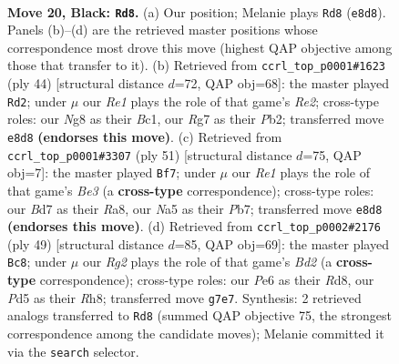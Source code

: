 \documentclass[11pt]{article}
\begin{document}
\clearpage

\begin{figure}[p]\centering
\begin{subfigure}{0.46\textwidth}\centering
\resizebox{\linewidth}{!}{%
\newchessgame
\chessboard[
  setfen={2k1rbn1/pp1b2r1/4p1p1/nP1pP1Pp/P2P1P1N/4K3/8/RNB2B1R b - - 0 20},
  showmover=false,
  pgfstyle=straightmove, color=movearrow, markmove={e8-d8}
]}
\caption{}
\end{subfigure}\hfill
\begin{subfigure}{0.46\textwidth}\centering
\resizebox{\linewidth}{!}{%
\newchessgame
\chessboard[
  setfen={1k5r/1p1r1pb1/4p1p1/p3P2p/Pn1p1P1P/5BP1/1PP1R1K1/R1B5 w - - 1 23},
  showmover=false,
  pgfstyle=straightmove, color=movearrow, markmove={e2-d2}
]}
\caption{}
\end{subfigure}
\\[4pt]
\begin{subfigure}{0.46\textwidth}\centering
\resizebox{\linewidth}{!}{%
\newchessgame
\chessboard[
  setfen={r5k1/1p2r1p1/2p1b2p/3n1p2/p1BPp3/P3P2P/1PRN1PPK/6R1 b - - 7 26},
  showmover=false,
  pgfstyle=straightmove, color=movearrow, markmove={e6-f7}
]}
\caption{}
\end{subfigure}\hfill
\begin{subfigure}{0.46\textwidth}\centering
\resizebox{\linewidth}{!}{%
\newchessgame
\chessboard[
  setfen={1k1r3r/pp1bbpp1/2p1p2p/N2nP3/1P1P4/P5P1/3NBP1P/R1R3K1 b - - 0 25},
  showmover=false,
  pgfstyle=straightmove, color=movearrow, markmove={d7-c8}
]}
\caption{}
\end{subfigure}
\caption{\textbf{Move 20, Black: \texttt{Rd8}.} (a) Our position; Melanie plays \texttt{Rd8} (\texttt{e8d8}). Panels (b)--(d) are the retrieved master positions whose correspondence most drove this move (highest QAP objective among those that transfer to it). (b) Retrieved from \texttt{ccrl\_top\_p0001\#1623} (ply 44) [structural distance $d$=72, QAP obj=68]: the master played \texttt{Rd2}; under $\mu$ our \emph{Re1} plays the role of that game's \emph{Re2}; cross-type roles: our \emph{N}g8 as their \emph{B}c1, our \emph{R}g7 as their \emph{P}b2; transferred move \texttt{e8d8} \textbf{(endorses this move)}. (c) Retrieved from \texttt{ccrl\_top\_p0001\#3307} (ply 51) [structural distance $d$=75, QAP obj=7]: the master played \texttt{Bf7}; under $\mu$ our \emph{Re1} plays the role of that game's \emph{Be3} (a \textbf{cross-type} correspondence); cross-type roles: our \emph{B}d7 as their \emph{R}a8, our \emph{N}a5 as their \emph{P}b7; transferred move \texttt{e8d8} \textbf{(endorses this move)}. (d) Retrieved from \texttt{ccrl\_top\_p0002\#2176} (ply 49) [structural distance $d$=85, QAP obj=69]: the master played \texttt{Bc8}; under $\mu$ our \emph{Rg2} plays the role of that game's \emph{Bd2} (a \textbf{cross-type} correspondence); cross-type roles: our \emph{P}e6 as their \emph{R}d8, our \emph{P}d5 as their \emph{R}h8; transferred move \texttt{g7e7}. Synthesis: 2 retrieved analogs transferred to \texttt{Rd8} (summed QAP objective 75, the strongest correspondence among the candidate moves); Melanie committed it via the \texttt{search} selector.}
\label{fig:thought-m39}
\end{figure}
\end{document}
